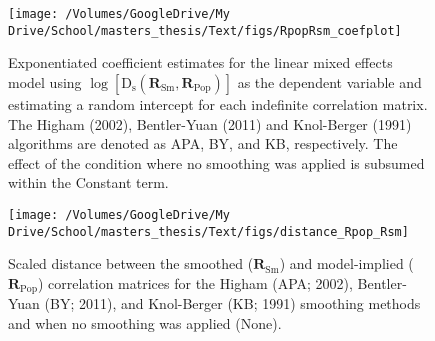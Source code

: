 \documentclass[
  english,
  man]{apa6}
\begin{document}
\begin{figure}

{\centering \texttt{[image: /Volumes/GoogleDrive/My Drive/School/masters\_thesis/Text/figs/RpopRsm\_coefplot]} 

}

\caption{Exponentiated coefficient estimates for the linear mixed effects model using $\log[\mathrm{D}_{\mathrm{s}}(\mathbf{R}_{\textrm{Sm}}, \mathbf{R}_{\textrm{Pop}})]$ as the dependent variable and estimating a random intercept for each indefinite correlation matrix. The Higham (2002), Bentler-Yuan (2011) and Knol-Berger (1991) algorithms are denoted as APA, BY, and KB, respectively. The effect of the condition where no smoothing was applied is subsumed within the Constant term.}\label{fig:coefplot-RpopRsm}
\end{figure}

\begin{figure}

{\centering \texttt{[image: /Volumes/GoogleDrive/My Drive/School/masters\_thesis/Text/figs/distance\_Rpop\_Rsm]} 

}

\caption{Scaled distance between the smoothed ($\mathbf{R}_{\textrm{Sm}}$) and model-implied ($\mathbf{R}_{\textrm{Pop}}$) correlation matrices for the Higham (APA; 2002), Bentler-Yuan (BY; 2011), and Knol-Berger (KB; 1991) smoothing methods and when no smoothing was applied (None).}\label{fig:distance-Rpop-Rsm}
\end{figure}
\end{document}
